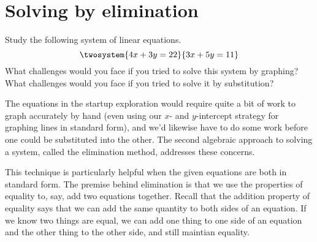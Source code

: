 %
%
%

\section{Solving by elimination}
\label{sec:syselimination}

\begin{boxexplore}
Study the following system of linear equations.
\[\twosystem{4x+3y=22}{3x+5y=11}\]
What challenges would you face if you tried to solve this system by graphing? What challenges would you face if you tried to solve it by substitution?
\end{boxexplore}

The equations in the startup exploration would require quite a bit of work to graph accurately by hand (even using our $x$- and $y$-intercept strategy for graphing lines in standard form), and we'd likewise have to do some work before one could be substituted into the other. The second algebraic approach to solving a system, called the \gls{elimination method}, addresses these concerns.

This technique is particularly helpful when the given equations are both in standard form. The premise behind elimination is that we use the properties of equality to, say, add two equations together. Recall that the addition property of equality says that we can add the same quantity to both sides of an equation. If we know two things are equal, we can add one thing to one side of an equation and the other thing to the other side, and still maintian equality.

